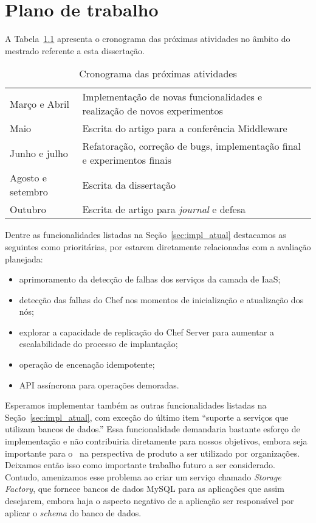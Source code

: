 \chapter{Plano de trabalho}
\label{cap:cronograma}

A Tabela~\ref{tab:cronograma} apresenta o cronograma das próximas atividades no âmbito do mestrado referente a esta dissertação.

\begin{table}[!ht]
\begin{center}
    \begin{tabular}{l l}
	 \hline
Março e Abril & Implementação de novas funcionalidades e realização de novos experimentos\\
Maio & Escrita do artigo para a conferência Middleware \\
Junho e julho & Refatoração, correção de bugs, implementação final e experimentos finais \\
Agosto e setembro & Escrita da dissertação \\
Outubro & Escrita de artigo para \textit{journal} e defesa \\
	 \hline
    \end{tabular}
  \caption{Cronograma das próximas atividades}
  \label{tab:cronograma}
\end{center}
\end{table}

Dentre as funcionalidades listadas na Seção~\ref{sec:impl_atual} destacamos as seguintes como prioritárias, por estarem diretamente relacionadas com a avaliação planejada:

\begin{itemize}
\item aprimoramento da detecção de falhas dos serviços da camada de IaaS;
\item detecção das falhas do Chef nos momentos de inicialização e atualização dos nós;
\item explorar a capacidade de replicação do Chef Server para aumentar a escalabilidade do processo de implantação;
\item operação de encenação idempotente;
\item API assíncrona para operações demoradas.
\end{itemize}

Esperamos implementar também as outras funcionalidades listadas na Seção~\ref{sec:impl_atual}, com exceção do último item ``suporte a serviços que utilizam bancos de dados.'' Essa funcionalidade demandaria bastante esforço de implementação e não contribuiria diretamente para nossos objetivos, embora seja importante para o \ee\ na perspectiva de produto a ser utilizado por organizações. Deixamos então isso como importante trabalho futuro a ser considerado. Contudo, amenizamos esse problema ao criar um serviço chamado \emph{Storage Factory}, que fornece bancos de dados MySQL para as aplicações que assim desejarem, embora haja o aspecto negativo de a aplicação ser responsável por aplicar o \emph{schema} do banco de dados.

